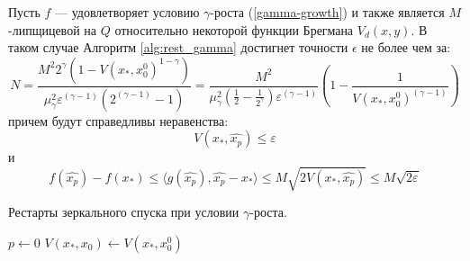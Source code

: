 \begin{theorem}
    Пусть $f$ --- удовлетворяет условию $\gamma$-роста (\ref{gamma-growth}) и также является $M$-липщицевой на $Q$ относительно некоторой функции Брегмана $V_d(x, y)$. В таком случае Алгоритм \ref{alg:rest_gamma} достигнет точности $\epsilon$ не более чем за:
    \begin{equation}
       N = \frac{M^2 2^{\gamma}(1 - V(x_*, x_0^0)^{1 - \gamma}) }{\mu_{\gamma}^2 \varepsilon^{(\gamma-1)} (2^{(\gamma-1)} - 1)} = \frac{M^2}{\mu_{\gamma}^2 (\frac{1}{2} - \frac{1}{2^\gamma}) \varepsilon^{(\gamma-1)} } (1 - \frac{1} {V(x_*, x_0^0)^{(\gamma - 1)}})
    \end{equation}
    причем будут справедливы неравенства:
    \begin{equation}
       V(x_*, \widehat{x_p}) \leq \varepsilon
    \end{equation}
    и
    \begin{equation}
        f(\widehat{x_p}) - f(x_*) \leq  \langle g(\widehat{x_p}), \widehat{x_p} - x_* \rangle \leq M \sqrt{ 2 V(x_*, \widehat{x_p})} \leq M \sqrt{2 \varepsilon}  
    \end{equation}
\end{theorem}

\begin{algorithm}[htp]
    \caption{Рестарты зеркального спуска при условии $\gamma$-роста.}
    \label{alg:rest_gamma}
    $p \gets 0$\;
    $V(x_*, x_0) \gets V(x_*,x_0^0)$\;
\end{algorithm}

